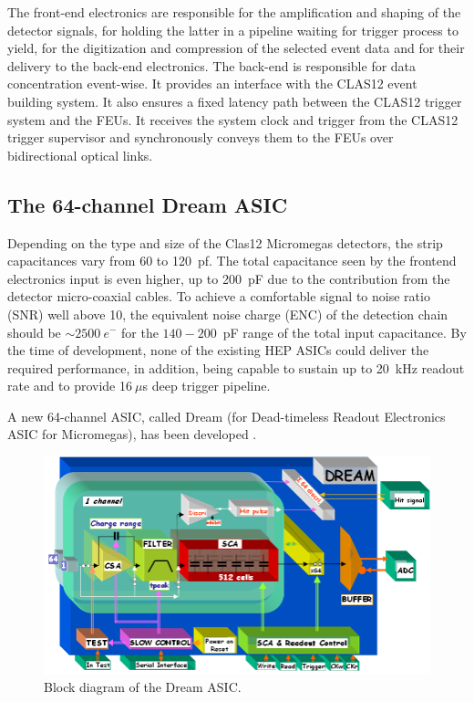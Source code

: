 The front-end electronics are responsible for the amplification and shaping of the detector signals, for holding the latter in a pipeline waiting for trigger process to yield, for the digitization and compression of the selected event data and for their delivery to the back-end electronics. The back-end is responsible for data concentration event-wise. It provides an interface with the CLAS12 event building system. It also ensures a fixed latency path between the CLAS12 trigger system and the FEUs. It receives the system clock and trigger from the CLAS12 trigger supervisor and synchronously conveys them to the FEUs over bidirectional optical links.

\subsection{The 64-channel Dream ASIC}
Depending on the type and size of the Clas12 Micromegas detectors, the strip capacitances vary from 60 to 120~pf. The total capacitance seen by the frontend electronics input is even higher, up to 200~pF due to the contribution from the detector micro-coaxial cables. To achieve a comfortable signal to noise ratio (SNR) well above 10, the equivalent noise charge (ENC) of the detection chain should be $\sim2500~e^-$ for the $140-200$~pF range of the total input capacitance. By the time of development, none of the existing HEP ASICs could deliver the required performance, in addition, being capable to sustain up to 20~kHz readout rate and to provide 16$~\mu$s deep trigger pipeline.

A new 64-channel ASIC, called Dream (for Dead-timeless Readout Electronics ASIC for Micromegas), has been developed \cite{DRM}. 

\begin{figure}[htb]
 \includegraphics[width=1.0\columnwidth,keepaspectratio]{images/electronics_fig2.png}
 \caption{Block diagram of the Dream ASIC.}
 \label{fig:mm-e_2}
\end{figure}

